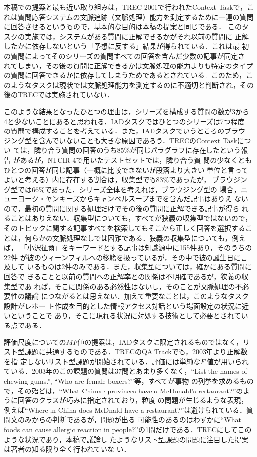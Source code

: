 \documentclass[japanese]{jnlp_1.4}
\begin{document}
本稿での提案と最も近い取り組みは，TREC 2001で行われたContext Taskで，こ
れは質問応答システムの文脈追跡（文脈処理）能力を測定するために一連の質問
に回答させるというもので，基本的な目的は本稿の提案と同じである\cite{Voorhees01}．
このタスクの実施では，システムがある質問に正解できるかがそれ以前の質問に
正解したかに依存しないという「予想に反する」結果が得られている．これは最
初の質問によってそのシリーズの質問すべての回答を含んだ少数の記事が同定さ
れてしまい，その後の質問に正解できるかは文脈処理の能力よりも特定のタイプ
の質問に回答できるかに依存してしまうためであるとされている．このため，こ
のようなタスクは現状では文脈処理能力を測定するのに不適切と判断され，その
後のTRECでは実施されていない．

このような結果となったひとつの理由は，シリーズを構成する質問の数が3から
4と少ないことにあると思われる．IADタスクではひとつのシリーズは7つ程度
の質問で構成することを考えている．また，IADタスクでいうところのブラウ
ジング型を含んでいないことも大きな原因であろう．TRECのContext Taskについ
ては，隣り合う質問の回答のうち85\%が同じパラグラフに存在したという報告
\cite{Harabagiu01}があるが，NTCIR-4で用いたテストセットでは，隣り合う質
問の少なくともひとつの回答が同じ記事（一概に比較できないが段落より大きい
単位と言ってよいと考える）内に存在する割合は，収集型でも83\%であったが，
ブラウジング型では66\%であった．シリーズ全体を考えれば，ブラウジング型の
場合，ニューヨーク・ヤンキーズからキャンベルスープまでを含んだ記事はありえ
ないので，最初の質問に関する処理だけでその後の質問に正解できる記事が得ら
れることはありえない．収集型についても，すべてが狭義の収集型ではないので，
そのトピックに関する記事すべてを検索してもそこから正しく回答を選択するこ
とは，何らかの文脈処理なしでは困難である．狭義の収集型についても，例えば，
「小沢征爾」をキーワードとする記事は知識源中に155件あり，そのうちの22件
が彼のウィーンフィルへの移籍を扱っているが，その中で彼の誕生日に言及して
いるものは2件のみである．また，収集型については，確かにある質問に回答で
きることと以前の質問への正解率との関係は不明確であるが，狭義の収集型であ
れば，そこに関係のある必然性はないし，そのことが文脈処理の不必要性の議論
につながるとは思えない．加えて重要なことは，このようなタスク設計がレポー
ト作成を目的とした情報アクセス対話という場面設定の状況に近いということで
あり，そこに現れる状況に対処する技術として必要とされている点である．

評価尺度についての$\mathit{MF}$値の提案は，IADタスクに限定されるものではなく，リ
スト型課題に共通するものである．TRECのQA Trackでも，2003年より正解数を指
定しないリスト型課題が開始されている\cite{Voorhees03}．評価には単純な$F$
値が用いられている．2003年のこの課題の質問は37問とあまり多くなく，``List
the names of chewing gums.'', ``Who are female boxers?''等，すべてが事物
の列挙を求めるもので，その殆どは，``What Chinese provinces have a
McDonald's restaurant?''のように回答のクラスが巧みに指定されており，粒度
の問題が生じるような表現，例えば``Where in China does McDnald have a
restaurant?''は避けられている．質問文のみからの判断であるが，問題が出る
可能性のあるのはわずかに``What foods can cause allergic reaction in
people?''の1問だけである．TRECにしてこのような状況であり，本稿で議論し
たようなリスト型課題の問題に注目した提案は著者の知る限り全く行われていな
い．
\end{document}
